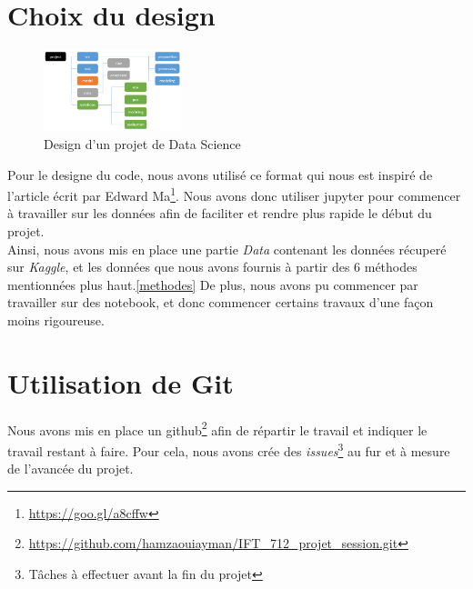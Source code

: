 \documentclass[12pt]{article}
\begin{document}
\newpage
\appendix
\section{Choix du design}
\begin{figure}
	\includegraphics[width=4cm]{./projet_structure.png}
	\caption{Design d'un projet de Data Science}
\end{figure}
Pour le designe du code, nous avons utilisé ce format qui nous est inspiré de l'article écrit par Edward Ma\footnote{\url{https://goo.gl/a8cffw}}. Nous avons donc utiliser jupyter pour commencer à travailler sur les données afin de faciliter et rendre plus rapide le début du projet.\\ 
Ainsi, nous avons mis en place une partie \emph{Data} contenant les données récuperé sur \textit{Kaggle}, et les données que nous avons fournis à partir des 6 méthodes mentionnées plus haut.\ref{methodes} De plus, nous avons pu commencer par travailler sur des notebook, et donc commencer certains travaux d'une façon moins rigoureuse. 


\section{Utilisation de Git}
Nous avons mis en place un github\footnote{\url{https://github.com/hamzaouiayman/IFT_712_projet_session.git}} afin de répartir le travail et indiquer le travail restant à faire. Pour cela, nous avons crée des \textit{issues}\footnote{Tâches à effectuer avant la fin du projet} au fur et à mesure de l'avancée du projet.
\end{document}
